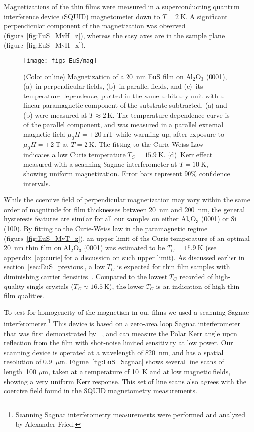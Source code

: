 Magnetizations of the thin films were measured in a superconducting quantum interference device (SQUID) magnetometer down to $T=2~\mathrm{K}$. A significant perpendicular component of the magnetization was observed (figure~\ref{fig:EuS_MvH_z}), whereas the easy axes are in the sample plane (figure~\ref{fig:EuS_MvH_x}).%
%
\begin{figure}[ht]%
    \subfloat{\label{fig:EuS_MvH_z}}%
    \subfloat{\label{fig:EuS_MvH_x}}%
    \subfloat{\label{fig:EuS_MvT_z}}%
    \subfloat{\label{fig:EuS_Sagnac}}%
    \centering%
    \texttt{[image: figs\_EuS/mag]}%
    \caption[Magnetic properties of EuS thin films]{\label{fig:EuS_magnetic}(Color online) Magnetization of a 20~nm EuS film on Al$_2$O$_3$ (0001), (a)~in perpendicular fields, (b)~in parallel fields, and (c)~its temperature dependence, plotted in the same arbitrary unit with a linear paramagnetic component of the substrate subtracted. (a) and (b) were measured at $T\approx2~\mathrm{K}$. The temperature dependence curve is of the parallel component, and was measured in a parallel external magnetic field $\mu_0H = +20~\mathrm{mT}$ while warming up, after exposure to $\mu_0H=+2~\mathrm{T}$ at $T=2~\mathrm{K}$. The fitting to the Curie-Weiss Law indicates a low Curie temperature $T_C=15.9~\mathrm{K}$. (d)~Kerr effect measured with a scanning Sagnac interferometer at $T=10~\mathrm{K}$, showing uniform magnetization. Error bars represent 90\% confidence intervals.}%
\end{figure} %
%
While the coercive field of perpendicular magnetization may vary within the same order of magnitude for film thicknesses between 20~nm and 200~nm, the general hysteresis features are similar for all our samples on either Al$_2$O$_3$ (0001) or Si (100). By fitting to the Curie-Weiss law in the paramagnetic regime (figure~\ref{fig:EuS_MvT_z}), an upper limit of the Curie temperature of an optimal 20~nm thin film on Al$_2$O$_3$ (0001) was estimated to be $T_C=15.9~\mathrm{K}$ (see appendix~\ref{ap:curie} for a discussion on such upper limit). As discussed earlier in section~\ref{sec:EuS_previous}, a low $T_C$ is expected for thin film samples with diminishing carrier densities~\cite{EuS_TC_doping, EuS_ntype, EuX_doped_transport, thickness_Tc_theory, thickness_Tc_exp}. Compared to the lowest $T_C$ recorded of high-quality single crystals ($T_C\approx16.5~\mathrm{K}$), the lower $T_C$ is an indication of high thin film qualities.

To test for homogeneity of the magnetism in our films we used a scanning Sagnac interferometer.\footnote{Scanning Sagnac interferometry measurements were performed and analyzed by Alexander Fried.} This device is based on a zero-area loop Sagnac interferometer that was first demonstrated by \citeauthor{Xia2006}~\cite{Xia2006}, and can measure the Polar Kerr angle upon reflection from the film with shot-noise limited sensitivity at low power. Our scanning device is operated at a wavelength of 820~nm, and has a spatial resolution of 0.9~$\mu$m. Figure~\ref{fig:EuS_Sagnac} shows several line scans of length~100 $\mu$m, taken at a temperature of 10~K and at low magnetic fields, showing a very uniform Kerr response. This set of line scans also agrees with the coercive field found in the SQUID magnetometry measurements.

